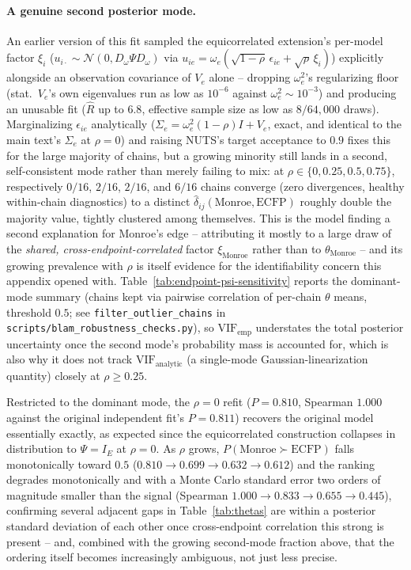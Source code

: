 \documentclass{article}
\begin{document}
\paragraph{A genuine second posterior mode.} An earlier version of this fit sampled the equicorrelated
extension's per-model factor $\xi_i$ ($u_{i\cdot} \sim \mathcal{N}(0, D_\omega\Psi D_\omega)$ via $u_{ie} =
\omega_e(\sqrt{1-\rho}\,\epsilon_{ie} + \sqrt\rho\,\xi_i)$) explicitly alongside an observation covariance of
$V_e$ alone -- dropping $\omega_e^2$'s regularizing floor (stat.\ $V_e$'s own eigenvalues run as low as
$10^{-6}$ against $\omega_e^2\!\sim\!10^{-3}$) and producing an unusable fit ($\hat R$ up to $6.8$, effective
sample size as low as $8/64{,}000$ draws). Marginalizing $\epsilon_{ie}$ analytically ($\Sigma_e =
\omega_e^2(1-\rho)I + V_e$, exact, and identical to the main text's $\Sigma_e$ at $\rho=0$) and raising NUTS's
target acceptance to $0.9$ fixes this for the large majority of chains, but a growing minority still lands in
a second, self-consistent mode rather than merely failing to mix: at $\rho \in \{0, 0.25, 0.5, 0.75\}$,
respectively $0/16$, $2/16$, $2/16$, and $6/16$ chains converge (zero divergences, healthy within-chain
diagnostics) to a distinct $\hat\delta_{ij}(\text{Monroe}, \text{ECFP})$ roughly double the majority value,
tightly clustered among themselves. This is the model finding a second explanation for Monroe's edge --
attributing it mostly to a large draw of the \emph{shared, cross-endpoint-correlated} factor $\xi_{\text{Monroe}}$
rather than to $\theta_{\text{Monroe}}$ -- and its growing prevalence with $\rho$ is itself evidence for the
identifiability concern this appendix opened with. Table~\ref{tab:endpoint-psi-sensitivity} reports the
dominant-mode summary (chains kept via pairwise correlation of per-chain $\theta$ means, threshold $0.5$; see
\texttt{filter\_outlier\_chains} in \texttt{scripts/blam\_robustness\_checks.py}), so $\mathrm{VIF}_{\mathrm{emp}}$
understates the total posterior uncertainty once the second mode's probability mass is accounted for, which is
also why it does not track $\mathrm{VIF}_{\mathrm{analytic}}$ (a single-mode Gaussian-linearization quantity)
closely at $\rho \geq 0.25$.

Restricted to the dominant mode, the $\rho=0$ refit ($P=0.810$, Spearman $1.000$ against the original
independent fit's $P=0.811$) recovers the original model essentially exactly, as expected since the
equicorrelated construction collapses in distribution to $\Psi=I_E$ at $\rho=0$. As $\rho$ grows,
$P(\text{Monroe}\succ\text{ECFP})$ falls monotonically toward $0.5$ ($0.810\to0.699\to0.632\to0.612$) and the
ranking degrades monotonically and with a Monte Carlo standard error two orders of magnitude smaller than the
signal (Spearman $1.000\to0.833\to0.655\to0.445$), confirming several adjacent gaps in Table~\ref{tab:thetas}
are within a posterior standard deviation of each other once cross-endpoint correlation this strong is
present -- and, combined with the growing second-mode fraction above, that the ordering itself becomes
increasingly ambiguous, not just less precise.

% 
\end{document}

